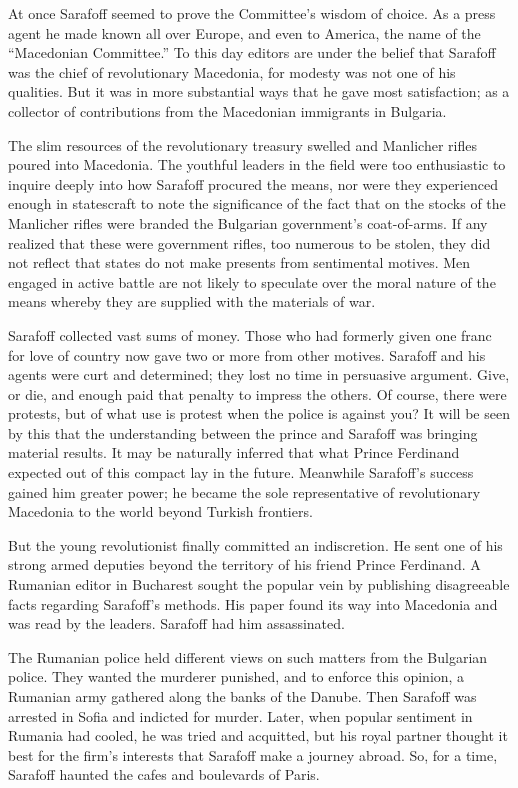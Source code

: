 \documentclass[a5paper,12pt]{book}
\begin{document}
At once Sarafoff seemed to prove the Committee’s wisdom of choice. As a press agent he made known all over Europe, and even to America, the name of the “Macedonian Committee.” To this day editors are under the belief that Sarafoff was the chief of revolutionary Macedonia, for modesty was not one of his qualities. But it was in more substantial ways that he gave most satisfaction; as a collector of contributions from the Macedonian immigrants in Bulgaria.

The slim resources of the revolutionary treasury swelled and Manlicher rifles poured into Macedonia. The youthful leaders in the field were too enthusiastic to inquire deeply into how Sarafoff procured the means, nor were they experienced enough in statescraft to note the significance of the fact that on the stocks of the Manlicher rifles were branded the Bulgarian government’s coat-of-arms. If any realized that these were government rifles, too numerous to be stolen, they did not reflect that states do not make presents from sentimental motives. Men engaged in active battle are not likely to speculate over the moral nature of the means whereby they are supplied with the materials of war.

Sarafoff collected vast sums of money. Those who had formerly given one franc for love of country now gave two or more from other motives. Sarafoff and his agents were curt and determined; they lost no time in persuasive argument. Give, or die, and enough paid that penalty to impress the others. Of course, there were protests, but of what use is protest when the police is against you? It will be seen by this that the understanding between the prince and Sarafoff was bringing material results. It may be naturally inferred that what Prince Ferdinand expected out of this compact lay in the future. Meanwhile Sarafoff’s success gained him greater power; he became the sole representative of revolutionary Macedonia to the world beyond Turkish frontiers.

But the young revolutionist finally committed an indiscretion. He sent one of his strong armed deputies beyond the territory of his friend Prince Ferdinand. A Rumanian editor in Bucharest sought the popular vein by publishing disagreeable facts regarding Sarafoff’s methods. His paper found its way into Macedonia and was read by the leaders. Sarafoff had him assassinated.

The Rumanian police held different views on such matters from the Bulgarian police. They wanted the murderer punished, and to enforce this opinion, a Rumanian army gathered along the banks of the Danube. Then Sarafoff was arrested in Sofia and indicted for murder. Later, when popular sentiment in Rumania had cooled, he was tried and acquitted, but his royal partner thought it best for the firm’s interests that Sarafoff make a journey abroad. So, for a time, Sarafoff haunted the cafes and boulevards of Paris.
\end{document}
